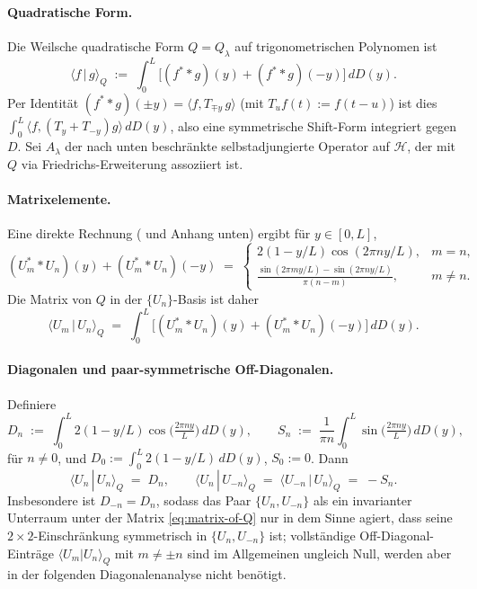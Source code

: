 \documentclass[11pt,a4paper]{article}
\theoremstyle{remark}
\theoremstyle{plain}
\begin{document}
\paragraph{Quadratische Form.} Die Weilsche quadratische Form $Q=Q_\lambda$ auf trigonometrischen Polynomen ist
\begin{equation}
\label{eq:quad-form-connesvs}
  \langle f \,|\, g\rangle_Q
  \;:=\; \int_0^L \bigl[(f^* * g)(y) + (f^* * g)(-y)\bigr]\,dD(y).
\end{equation}
Per Identität $(f^**g)(\pm y) = \langle f, T_{\mp y}\,g\rangle$ (mit $T_u f(t):=f(t-u)$) ist dies $\int_0^L \langle f, (T_y + T_{-y})g\rangle\,dD(y)$, also eine symmetrische Shift-Form integriert gegen $D$. Sei $A_\lambda$ der nach unten beschränkte selbstadjungierte Operator auf $\mathcal{H}$, der mit $Q$ via Friedrichs-Erweiterung assoziiert ist.

\paragraph{Matrixelemente.} Eine direkte Rechnung (\cite[Gleichung~7]{ConnesvS2025} und Anhang unten) ergibt für $y\in[0,L]$,
\begin{equation}
\label{eq:matrix-elements-Q}
  (U_m^* * U_n)(y) + (U_m^* * U_n)(-y)
  \;=\;
  \begin{cases}
    2(1-y/L)\cos(2\pi n y/L), & m=n,\\[2pt]
    \displaystyle\frac{\sin(2\pi m y/L) - \sin(2\pi n y/L)}{\pi(n-m)}, & m\neq n.
  \end{cases}
\end{equation}
Die Matrix von $Q$ in der $\{U_n\}$-Basis ist daher
\begin{equation}
\label{eq:matrix-of-Q}
  \langle U_m \,|\, U_n\rangle_Q
  \;=\;
  \int_0^L
  \bigl[(U_m^* * U_n)(y) + (U_m^* * U_n)(-y)\bigr]\,dD(y).
\end{equation}

\paragraph{Diagonalen und paar-symmetrische Off-Diagonalen.} Definiere
\begin{equation}
\label{eq:Dn-Sn}
  D_n \;:=\; \int_0^L 2(1 - y/L)\cos\!\Big(\tfrac{2\pi n y}{L}\Big)\,dD(y),
  \qquad
  S_n \;:=\; \frac{1}{\pi n}\int_0^L \sin\!\Big(\tfrac{2\pi n y}{L}\Big)\,dD(y),
\end{equation}
für $n\neq 0$, und $D_0:=\int_0^L 2(1-y/L)\,dD(y)$, $S_0:=0$. Dann
\begin{equation}
\label{eq:U-diag-and-pair}
  \langle U_n\,|\,U_n\rangle_Q \;=\; D_n,
  \qquad
  \langle U_n\,|\,U_{-n}\rangle_Q
  \;=\; \langle U_{-n}\,|\,U_n\rangle_Q
  \;=\; -S_n.
\end{equation}
Insbesondere ist $D_{-n}=D_n$, sodass das Paar $\{U_n, U_{-n}\}$ als ein invarianter Unterraum unter der Matrix \eqref{eq:matrix-of-Q} nur in dem Sinne agiert, dass seine $2\times 2$-Einschränkung symmetrisch in $\{U_n, U_{-n}\}$ ist; vollständige Off-Diagonal-Einträge $\langle U_m | U_n \rangle_Q$ mit $m\neq \pm n$ sind im Allgemeinen ungleich Null, werden aber in der folgenden Diagonalenanalyse nicht benötigt.
\end{document}
